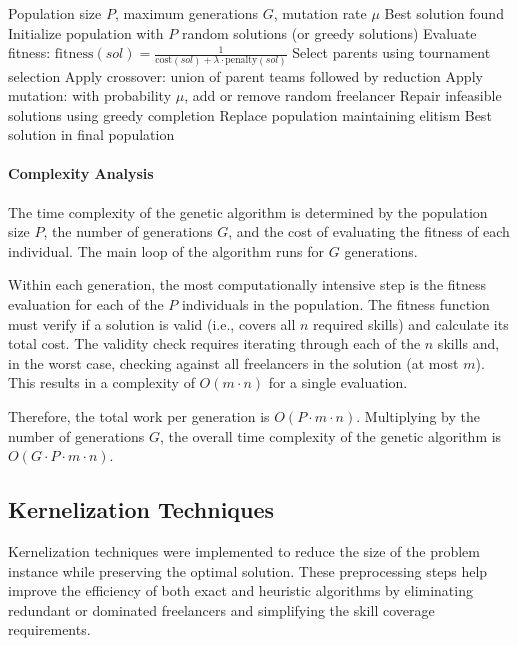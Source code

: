 \documentclass[12pt,a4paper]{article}
\begin{document}
\begin{algorithm}[H]
	\caption{Genetic Algorithm for MCSC}
	\label{alg:genetic}
	\begin{algorithmic}[1]
		\Require Population size $P$, maximum generations $G$, mutation rate $\mu$
		\Ensure Best solution found
		\State Initialize population with $P$ random solutions (or greedy solutions)
		\State Evaluate fitness: $\text{fitness}(sol) = \frac{1}{\text{cost}(sol) + \lambda \cdot \text{penalty}(sol)}$
		\State Select parents using tournament selection
		\State Apply crossover: union of parent teams followed by reduction
		\State Apply mutation: with probability $\mu$, add or remove random freelancer
		\State Repair infeasible solutions using greedy completion
		\State Replace population maintaining elitism
		\EndFor
		\State \Return Best solution in final population
	\end{algorithmic}
\end{algorithm}

\paragraph{Complexity Analysis}
The time complexity of the genetic algorithm is determined by the population size $P$, the number of generations $G$, and the cost of evaluating the fitness of each individual. The main loop of the algorithm runs for $G$ generations.

Within each generation, the most computationally intensive step is the fitness evaluation for each of the $P$ individuals in the population. The fitness function must verify if a solution is valid (i.e., covers all $n$ required skills) and calculate its total cost. The validity check requires iterating through each of the $n$ skills and, in the worst case, checking against all freelancers in the solution (at most $m$). This results in a complexity of $O(m \cdot n)$ for a single evaluation.

Therefore, the total work per generation is $O(P \cdot m \cdot n)$. Multiplying by the number of generations $G$, the overall time complexity of the genetic algorithm is $O(G \cdot P \cdot m \cdot n)$.

\subsection{Kernelization Techniques}
\label{subsec:kernelization}

Kernelization techniques were implemented to reduce the size of the problem instance while preserving the optimal solution. These preprocessing steps help improve the efficiency of both exact and heuristic algorithms by eliminating redundant or dominated freelancers and simplifying the skill coverage requirements.
\end{document}
